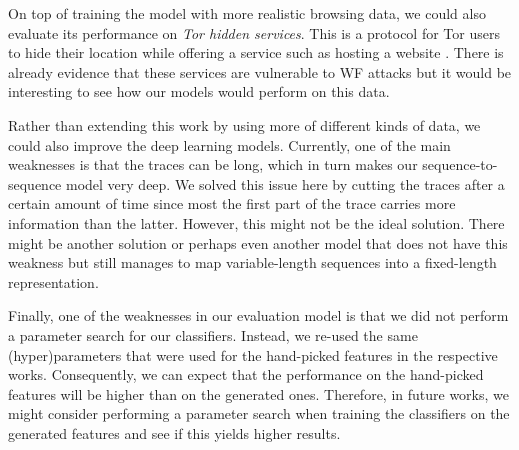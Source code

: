 On top of training the model with more realistic browsing data, we could also evaluate its performance on \textit{Tor hidden services}.
This is a protocol for Tor users to hide their location while offering a service such as hosting a website \cite{tor_hidden_services}.
There is already evidence that these services are vulnerable to WF attacks \cite{kfingerprinting} but it would be interesting to see how our models would perform on this data.

Rather than extending this work by using more of different kinds of data, we could also improve the deep learning models.
Currently, one of the main weaknesses is that the traces can be long, which in turn makes our sequence-to-sequence model very deep.
We solved this issue here by cutting the traces after a certain amount of time since most the first part of the trace carries more information than the latter.
However, this might not be the ideal solution.
There might be another solution or perhaps even another model that does not have this weakness but still manages to map variable-length sequences into a fixed-length representation.

Finally, one of the weaknesses in our evaluation model is that we did not perform a parameter search for our classifiers.
Instead, we re-used the same (hyper)parameters that were used for the hand-picked features in the respective works.
Consequently, we can expect that the performance on the hand-picked features will be higher than on the generated ones.
Therefore, in future works, we might consider performing a parameter search when training the classifiers on the generated features and see if this yields higher results.

